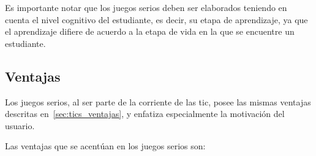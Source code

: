 Es importante notar que los juegos serios deben ser elaborados teniendo en cuenta el
nivel cognitivo del estudiante, es decir, su etapa de aprendizaje, ya que el
aprendizaje difiere de acuerdo a la etapa de vida en la que se encuentre un
estudiante\cite{education:games}.

\subsection{Ventajas}


Los juegos serios, al ser parte de la corriente de las \Gls{tic}, posee las
mismas ventajas descritas en~\ref{sec:tics_ventajas}, y enfatiza especialmente
la motivación del usuario.

Las ventajas que se acentúan en los juegos serios son:

